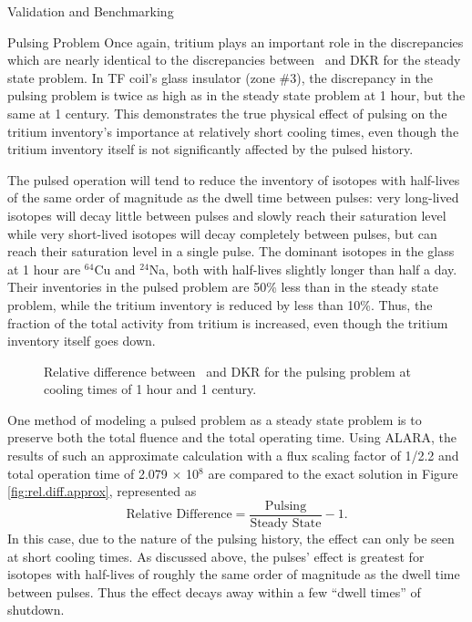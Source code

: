 \begin{chapter}{Validation and Benchmarking\label{chap:valid}}
\begin{section}{Pulsing Problem\label{sec:valid.pulse}}
    Once again, tritium plays an important role in the discrepancies
    which are nearly identical to the discrepancies between \ALARA\ 
    and DKR for the steady state problem.  In TF coil's glass
    insulator (zone \#3), the discrepancy in the pulsing problem is
    twice as high as in the steady state problem at 1 hour, but the
    same at 1 century.  This demonstrates the true physical effect of
    pulsing on the tritium inventory's importance at relatively short
    cooling times, even though the tritium inventory itself is not
    significantly affected by the pulsed history.
    
    The pulsed operation will tend to reduce the inventory of isotopes
    with half-lives of the same order of magnitude as the dwell time
    between pulses: very long-lived isotopes will decay little between
    pulses and slowly reach their saturation level while very
    short-lived isotopes will decay completely between pulses, but can
    reach their saturation level in a single pulse\cite{Pulsar}.  The
    dominant isotopes in the glass at 1 hour are $^{64}$Cu and
    $^{24}$Na, both with half-lives slightly longer than half a day.
    Their inventories in the pulsed problem are 50\% less than in the
    steady state problem, while the tritium inventory is reduced by
    less than 10\%.  Thus, the fraction of the total activity from
    tritium is increased, even though the tritium inventory itself
    goes down.

    \begin{figure}[htbp]
      \begin{center}
        \caption{Relative difference between \ALARA\  and DKR for
          the pulsing problem at cooling times of 1 hour and 1 century.}
        \label{fig:rel.diff.p.1}
      \end{center}
    \end{figure}
    
    One method of modeling a pulsed problem as a steady state problem
    is to preserve both the total fluence and the total operating
    time\cite{Pulsar,hosny,qingming}.  Using ALARA, the results of
    such an approximate calculation with a flux scaling factor of
    1/2.2 and total operation time of 2.079 $\times$ 10$^8$ are
    compared to the exact solution in Figure
    \ref{fig:rel.diff.approx}, represented as
    $$\mbox{Relative Difference} = \frac{\mbox{Pulsing}}{\mbox{Steady
        State}} - 1.$$
    In this case, due to the nature of the pulsing
    history, the effect can only be seen at short cooling times.  As
    discussed above, the pulses' effect is greatest for isotopes with
    half-lives of roughly the same order of magnitude as the dwell
    time between pulses.  Thus the effect decays away within a few
    ``dwell times'' of shutdown.
    

\end{section}
\end{chapter}
